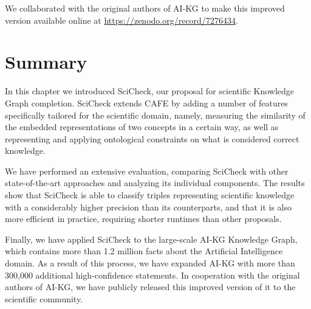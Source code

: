 We collaborated with the original authors of AI-KG to make this improved version available online at \url{https://zenodo.org/record/7276434}. 

\section{Summary}\label{sec:sci-summary}
In this chapter we introduced SciCheck, our proposal for scientific Knowledge Graph completion. SciCheck extends CAFE by adding a number of features specifically tailored for the scientific domain, namely, measuring the similarity of the embedded representations of two concepts in a certain way, as well as representing and applying ontological constraints on what is considered correct knowledge.

We have performed an extensive evaluation, comparing SciCheck with other state-of-the-art approaches and analyzing its individual components. The results show that SciCheck is able to classify triples representing scientific knowledge with a considerably higher precision than its counterparts, and that it is also more efficient in practice, requiring shorter runtimes than other proposals.

Finally, we have applied SciCheck to the large-scale AI-KG Knowledge Graph, which contains more than 1.2 million facts about the Artificial Intelligence domain. As a result of this process, we have expanded AI-KG with more than 300,000 additional high-confidence statements. In cooperation with the original authors of AI-KG, we have publicly released this improved version of it to the scientific community.